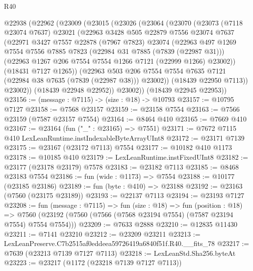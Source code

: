 \begin{lexlean}{R40}
\begin{coremodule}
  @22938
    (@22962
      (@23009
        (@23015
          (@23026
            (@23064
              (@23070
                (@23073
                  (@7118 @23074 @7637)
                  @23021
                  (@22963
                    @3428
                    @505
                    @22879
                    @7556
                    @23074
                    @7637
                    (@22971
                      @3427
                      @7557
                      @22878
                      (@7967 @7823)
                      @23074
                      (@22963
                        @497
                        @1269
                        @7554
                        @7556
                        @7885
                        @7823
                        (@22984 @31 @7885 (@7839 (@22987 @31)))
                        (@22963 @1267 @206 @7554 @7554 @1266 @7121 (@22999 @1266) @23002))
                      (@18431 @7127 @1265))
                    (@22963
                      @503
                      @206
                      @7554
                      @7554
                      @7635
                      @7121
                      (@22984 @38 @7635 (@7839 (@22987 @38)))
                      @23002))
                  (@18439 @22950 @7113))
                @23002))
            (@18439 @22948 @22952))
          @23002))
      (@18439 @22945 @22953))
@23156 := (message : @7115) -> (size : @18) -> @10793
@23157 := @10795 @7127
@23158 := @7568 @23157
@23159 := @23158 @7554
@23163 := @7566 @23159 (@7587 @23157 @7554)
@23164 := @8464 @410
@23165 := @7669 @410
@23167 := @23164 (fun ("_" : @23165) => @7551)
@23171 := @7672 @7115 @410 LexLeanRuntime.instIndexableByteArrayUInt8
@23172 := @23171 @7139
@23175 := @23167 (@23172 @7113) @7554
@23177 := @10182 @410 @1173
@23178 := @10185 @410
@23179 := LexLeanRuntime.instFixedUInt8
@23182 := @23177 (@23178 @23179) @7578
@23183 := @23182 @7113
@23185 := @8468 @23183 @7554
@23186 := fun (wide : @1173) => @7554
@23188 := @10177 (@23185 @23186)
@23189 := fun (byte : @410) => @23188
@23192 := @23163 (@7560 (@23175 @23189))
@23193 := @22137 @7113
@23194 := @23193 @7127
@23208 := fun (message : @7115) =>
  fun (size : @18) =>
  fun (position : @18) =>
  @7560 (@23192 (@7560 (@7566 (@7568 @23194 @7554) (@7587 @23194 @7554) @7554 @7554)))
@23209 := @7633 @2888
@23210 := @12835 @11430
@23211 := @7141 @23210
@23212 := @23209 @23211
@23213 := LexLeanPreserve.C7b2515af0eddeea59726419a6840f51f.R40.__fits_78
@23217 := @7639 (@23213 @7139 @7127 @7113)
@23218 := LexLeanStd.Sha256.byteAt
@23223 := @23217 (@1172 (@23218 @7139 @7127 @7113))

\end{coremodule}
\end{lexlean}
